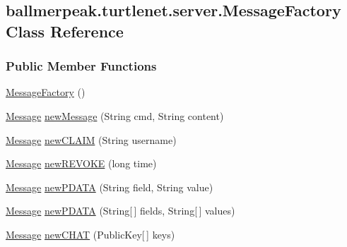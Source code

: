 \hypertarget{classballmerpeak_1_1turtlenet_1_1server_1_1MessageFactory}{\subsection{ballmerpeak.\-turtlenet.\-server.\-Message\-Factory Class Reference}
\label{classballmerpeak_1_1turtlenet_1_1server_1_1MessageFactory}
}
\subsubsection*{Public Member Functions}
\begin{DoxyCompactItemize}
\item 
\hyperlink{classballmerpeak_1_1turtlenet_1_1server_1_1MessageFactory_af1d89c1c60b23a27b395ced57813edf1}{Message\-Factory} ()
\item 
\hyperlink{classballmerpeak_1_1turtlenet_1_1shared_1_1Message}{Message} \hyperlink{classballmerpeak_1_1turtlenet_1_1server_1_1MessageFactory_a7002eaa445dc787d9f48c522e3c4d38f}{new\-Message} (String cmd, String content)
\item 
\hyperlink{classballmerpeak_1_1turtlenet_1_1shared_1_1Message}{Message} \hyperlink{classballmerpeak_1_1turtlenet_1_1server_1_1MessageFactory_a96cb2d8fa129ec51603a53f0bffd821d}{new\-C\-L\-A\-I\-M} (String username)
\item 
\hyperlink{classballmerpeak_1_1turtlenet_1_1shared_1_1Message}{Message} \hyperlink{classballmerpeak_1_1turtlenet_1_1server_1_1MessageFactory_aef6d14c4ca6c13776d25fa525c1f39fc}{new\-R\-E\-V\-O\-K\-E} (long time)
\item 
\hyperlink{classballmerpeak_1_1turtlenet_1_1shared_1_1Message}{Message} \hyperlink{classballmerpeak_1_1turtlenet_1_1server_1_1MessageFactory_a46db634da1ffe850a4066cae406db0cd}{new\-P\-D\-A\-T\-A} (String field, String value)
\item 
\hyperlink{classballmerpeak_1_1turtlenet_1_1shared_1_1Message}{Message} \hyperlink{classballmerpeak_1_1turtlenet_1_1server_1_1MessageFactory_a1a8e1c48e4a813a743ddc65fc73616bb}{new\-P\-D\-A\-T\-A} (String\mbox{[}$\,$\mbox{]} fields, String\mbox{[}$\,$\mbox{]} values)
\item 
\hyperlink{classballmerpeak_1_1turtlenet_1_1shared_1_1Message}{Message} \hyperlink{classballmerpeak_1_1turtlenet_1_1server_1_1MessageFactory_abe8168e826ccb131414c28811af014ec}{new\-C\-H\-A\-T} (Public\-Key\mbox{[}$\,$\mbox{]} keys)
\item 

\end{DoxyCompactItemize}
